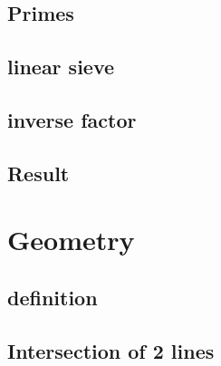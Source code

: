 \documentclass[a4paper,10pt,twocolumn,oneside]{article}
\begin{document}
% 

%

\subsection{Primes}


\subsection{linear sieve}


\subsection{inverse factor}


\subsection{Result}


\section{Geometry}

% 

\subsection{definition}


\subsection{Intersection of 2 lines}


% 
\end{document}
